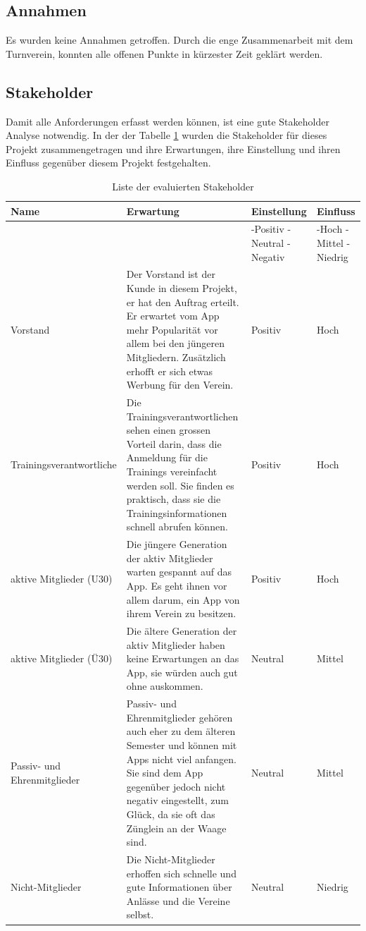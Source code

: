 \FloatBarrier
\subsection{Annahmen}\label{annahmen}
Es wurden keine Annahmen getroffen. Durch die enge Zusammenarbeit mit dem Turnverein, konnten alle offenen Punkte in kürzester Zeit geklärt werden.

\newpage
\subsection{Stakeholder}\label{stakeholder}
Damit alle Anforderungen erfasst werden können, ist eine gute Stakeholder Analyse notwendig. In der der Tabelle \ref{table:stakeholder} wurden die Stakeholder für dieses Projekt zusammengetragen und ihre Erwartungen, ihre Einstellung und ihren Einfluss gegenüber diesem Projekt festgehalten.

\begin{table}[ht]
\centering
  \begin{tabular}{ l | p{5cm} | p{1.5cm} | p{1.5cm} }
	\hline
	\rowcolor{darkgray}
	Name							&	Erwartung		&	Einstellung 	&	Einfluss	\\ \hline
	\rowcolor{gray}
								&				&	-Positiv \mbox{-Neutral} \mbox{-Negativ} 	&	-Hoch \mbox{-Mittel} \mbox{-Niedrig} \\ \hline
	Vorstand						&	Der Vorstand ist der Kunde in diesem Projekt, er hat den Auftrag erteilt. Er erwartet vom App mehr Popularität vor allem bei den jüngeren Mitgliedern. Zusätzlich erhofft er sich etwas Werbung für den Verein.			
												& 	Positiv		&	Hoch		\\ \hline
	Trainingsverantwortliche				&	Die Trainingsverantwortlichen sehen einen grossen Vorteil darin, dass die Anmeldung für die Trainings vereinfacht werden soll. Sie finden es praktisch, dass sie die Trainingsinformationen schnell abrufen können.			
												& 	Positiv		&	Hoch		\\ \hline
	aktive Mitglieder (U30)				&	Die jüngere Generation der aktiv Mitglieder warten gespannt auf das App. Es geht ihnen vor allem darum, ein App von ihrem Verein zu besitzen.			
												& 	Positiv		&	Hoch		\\ \hline
	aktive Mitglieder (Ü30)				&	Die ältere Generation der aktiv Mitglieder haben keine Erwartungen an das App, sie würden auch gut ohne auskommen. 		
												& 	Neutral	&	Mittel		\\ \hline
	Passiv- und Ehrenmitglieder			&	Passiv- und Ehrenmitglieder gehören auch eher zu dem älteren Semester und können mit Apps nicht viel anfangen. Sie sind dem App gegenüber jedoch nicht negativ eingestellt, zum Glück, da sie oft das Zünglein an der Waage sind.
												& 	Neutral	&	Mittel		\\ \hline
	Nicht-Mitglieder					&	Die Nicht-Mitglieder erhoffen sich schnelle und gute Informationen über Anlässe und die Vereine selbst.
												& 	Neutral	&	Niedrig	\\ \hline
  \end{tabular}
   \caption{Liste der evaluierten Stakeholder}\label{table:stakeholder}
\end{table}

